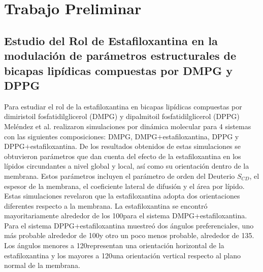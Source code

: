 \section{Trabajo Preliminar}\label{ss:pre}
\subsection{Estudio del Rol de Estafiloxantina en la modulaci\'{o}n de par\'{a}metros estructurales de bicapas lip\'{i}dicas compuestas por DMPG y DPPG  \cite{MelendezDelgado2018StudyingBilayers}}
Para estudiar el rol de la estafiloxantina en bicapas lip\'{i}dicas compuestas por dimiristoil fosfatidilglicerol (DMPG) y dipalmitoil fosfatidilglicerol (DPPG) Mel\'{e}ndez et al. \cite{MelendezDelgado2018StudyingBilayers} realizaron simulaciones por din\'{a}mica molecular para 4 sistemas con las siguientes composiciones: DMPG, DMPG$+$estafiloxantina, DPPG y DPPG$+$estafiloxantina. De los resultados obtenidos de estas simulaciones se obtuvieron par\'{a}metros que dan cuenta del efecto de la estafiloxantina en los l\'{i}pidos circundantes a nivel global y local, as\'{i} como su orientaci\'{o}n dentro de la membrana. Estos par\'{a}metros incluyen el par\'{a}metro de orden del Deuterio $S_{CD}$, el espesor de la membrana, el coeficiente lateral de difusi\'{o}n y el \'{a}rea por l\'{i}pido. \\

Estas simulaciones revelaron que la estafiloxantina adopta dos orientaciones diferentes respecto a la membrana. La estafiloxantina se encontr\'{o} mayoritariamente alrededor de los 100\textdegree para el sistema   DMPG+estafiloxantina. Para el sistema  DPPG+estafiloxantina muestre\'{o} dos \'{a}ngulos preferenciales,  uno m\'{a}s probable alrededor de 100\textdegree y otro un poco menos probable, alrededor de 135\textdegree. Los \'{a}ngulos menores a 120\textdegree representan una orientaci\'{o}n horizontal de la estafiloxantina y los mayores a 120\textdegree  una orientaci\'{o}n vertical respecto al plano normal de la membrana.\\

